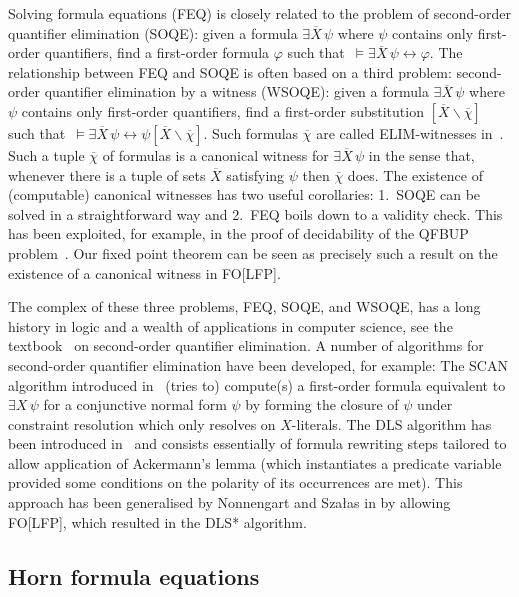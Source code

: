 \documentclass[acmsmall]{acmart}
\theoremstyle{plain}
\theoremstyle{definition}
\renewcommand{\phi}{\varphi}
\newcommand{\mybar}[1]{\overline{#1}}
\newcommand{\sop}{[} %
\newcommand{\scl}{]} %
\newcommand{\sel}[2]{#1 \backslash #2} %
\newcommand{\unsubst}[2]{\sop \sel{#1}{#2} \scl} %
\newcommand{\liff}{\leftrightarrow} %
\begin{document}
Solving formula equations (FEQ) is closely related to the problem of second-order quantifier elimination (SOQE):
given a formula $\exists \mybar{X}\, \psi$ where $\psi$ contains only first-order quantifiers, find
 a first-order formula $\phi$ such that\ $\models \exists \mybar{X}\, \psi \liff \phi$.
The relationship between FEQ and SOQE is often based on a third problem:
 second-order quantifier elimination by a witness (WSOQE): given a formula $\exists \mybar{X}\, \psi$ where $\psi$ contains only first-order
 quantifiers, find a first-order substitution $\unsubst{\mybar{X}}{\mybar{\chi}}$
 such that\ $\models \exists \mybar{X}\, \psi \liff \psi\unsubst{\mybar{X}}{\mybar{\chi}}$.
Such formulas $\mybar{\chi}$ are called ELIM-witnesses in~\cite{Wernhard17Boolean}.
Such a tuple $\mybar{\chi}$ of formulas is a canonical witness for $\exists \mybar{X}\, \psi$
 in the sense that, whenever there is a tuple of sets $\mybar{X}$ satisfying $\psi$ then
 $\mybar{\chi}$ does.
The existence of (computable) canonical witnesses has two useful corollaries:
 1.~SOQE can be solved in a straightforward way and 2.~FEQ boils down to a validity check.
This has been exploited, for example, in the proof of decidability of the QFBUP
 problem~\cite{Eberhard17Boolean}.
Our fixed point theorem can be seen as precisely such a result on the existence of a canonical
 witness in FO[LFP].

The complex of these three problems, FEQ, SOQE, and WSOQE, has a long history in logic and
 a wealth of applications in computer science,
see the textbook~\cite{Gabbay08Second} on second-order quantifier elimination.
A number of algorithms for second-order quantifier elimination have been developed, for example:
The SCAN algorithm introduced in~\cite{Gabbay92Quantifier} (tries to) compute(s) a first-order formula equivalent to $\exists X\, \psi$
 for a conjunctive normal form $\psi$ by forming the closure of $\psi$ under constraint resolution which
 only resolves on $X$-literals.
The DLS algorithm has been introduced in~\cite{Doherty97Computing} and consists essentially of
 formula rewriting steps tailored to allow application of Ackermann's lemma (which instantiates a predicate
 variable provided some conditions on the polarity of its occurrences are met). This approach has been
generalised by Nonnengart and Sza{\l}as in \cite{Nonnengart98Fixpoint} by allowing FO[LFP], which resulted in the DLS* algorithm.

\subsection{Horn formula equations}
\end{document}

